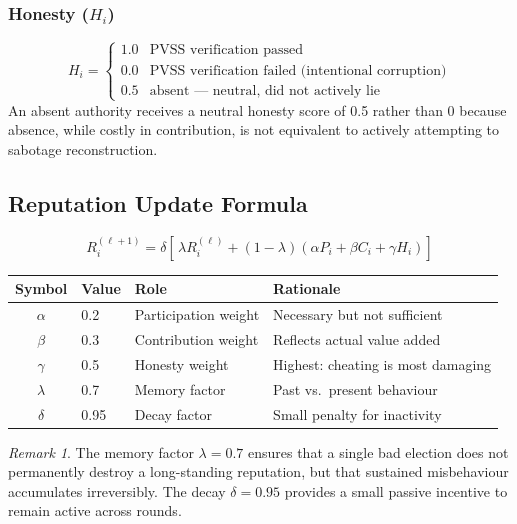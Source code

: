 \documentclass[12pt,a4paper]{article}
\theoremstyle{definition}
\theoremstyle{remark}
\newtheorem{remark}{Remark}[section]
\begin{document}
\subsubsection*{Honesty ($H_i$)}
\begin{equation}
  H_i = \begin{cases}
    1.0 & \text{PVSS verification passed} \\
    0.0 & \text{PVSS verification failed (intentional corruption)} \\
    0.5 & \text{absent — neutral, did not actively lie}
  \end{cases}
\end{equation}
An absent authority receives a neutral honesty score of 0.5 rather than 0
because absence, while costly in contribution, is not equivalent to
actively attempting to sabotage reconstruction.

\subsection{Reputation Update Formula}

\begin{equation}
  \boxed{R_i^{(\ell+1)} = \delta \left[\,
    \lambda R_i^{(\ell)} +
    (1-\lambda)\left(\alpha P_i + \beta C_i + \gamma H_i\right)
  \right]}
  \label{eq:rep}
\end{equation}

\begin{center}
\begin{tabular}{clll}
\toprule
Symbol & Value & Role & Rationale \\
\midrule
$\alpha$ & 0.2 & Participation weight & Necessary but not sufficient \\
$\beta$  & 0.3 & Contribution weight  & Reflects actual value added \\
$\gamma$ & 0.5 & Honesty weight       & Highest: cheating is most damaging \\
$\lambda$ & 0.7 & Memory factor       & Past vs.\ present behaviour \\
$\delta$ & 0.95 & Decay factor        & Small penalty for inactivity \\
\bottomrule
\end{tabular}
\end{center}

\begin{remark}
  The memory factor $\lambda = 0.7$ ensures that a single bad election does
  not permanently destroy a long-standing reputation, but that sustained
  misbehaviour accumulates irreversibly. The decay $\delta = 0.95$ provides
  a small passive incentive to remain active across rounds.
\end{remark}
\end{document}
